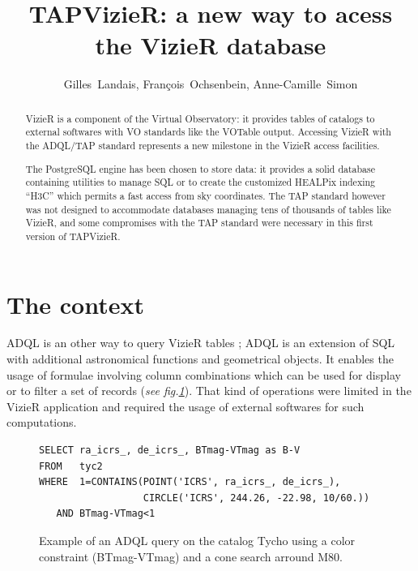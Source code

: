 
\resetcounters



\resetcounters

\title{TAPVizieR: a new way to acess the VizieR database}
\author{Gilles~Landais, Fran\c cois~Ochsenbein, Anne-Camille~Simon
}


\begin{abstract}
VizieR is a component of the Virtual Observatory: it provides tables of
catalogs to external softwares with VO standards like the VOTable output.
Accessing VizieR with the ADQL/TAP standard represents a new milestone
in the VizieR access facilities.

The PostgreSQL engine has been chosen to store data: it provides a solid
database containing utilities to manage SQL or to create the customized
HEALPix indexing ``H3C'' which permits a fast access from sky coordinates.
The TAP standard however was not designed to accommodate databases
managing tens of thousands of tables like VizieR, and some compromises
with the TAP standard were necessary in this first version of TAPVizieR.
\end{abstract}

\section{The context}

ADQL \citep{adql_2011} is an other way to query VizieR tables 
\citep{ochsenbein_2000}; ADQL is an extension of SQL 
with additional astronomical functions and geometrical objects. 
It enables the usage of formulae involving column combinations which can be used 
for display or to filter a set of records (\textit{see fig.\ref{P044:ADQLexample}}). 
That kind of operations were limited in the VizieR application and required 
the usage of external softwares for such computations.

\begin{figure}[!h] \center
\begin{footnotesize}
\begin{verbatim}
SELECT ra_icrs_, de_icrs_, BTmag-VTmag as B-V
FROM   tyc2
WHERE  1=CONTAINS(POINT('ICRS', ra_icrs_, de_icrs_),
                  CIRCLE('ICRS', 244.26, -22.98, 10/60.))
   AND BTmag-VTmag<1
\end{verbatim}\end{footnotesize}
\caption{Example of an ADQL query on the catalog Tycho using a color 
constraint (BTmag-VTmag) and a cone search arround M80.}\label{P044:ADQLexample}
\end{figure}

